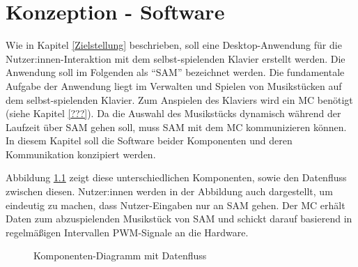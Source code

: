 
\nocite{*}
\chapter{Konzeption - Software} \label{vorgehenSW}


Wie in Kapitel \ref{Zielstellung} beschrieben, soll eine Desktop-Anwendung für die Nutzer:innen-Interaktion mit dem selbst-spielenden Klavier erstellt werden.
Die Anwendung soll im Folgenden als \enquote{\ac{SAM}} bezeichnet werden.
Die fundamentale Aufgabe der Anwendung liegt im Verwalten und Spielen von Musikstücken auf dem selbst-spielenden Klavier.
Zum Anspielen des Klaviers wird ein \ac{MC} benötigt (siehe Kapitel \ref{???}).
Da die Auswahl des Musikstücks dynamisch während der Laufzeit über \ac{SAM} gehen soll, muss \ac{SAM} mit dem \ac{MC} kommunizieren können.
In diesem Kapitel soll die Software beider Komponenten und deren Kommunikation konzipiert werden.

Abbildung \ref*{fig:high-level-komponenten} zeigt diese unterschiedlichen Komponenten, sowie den Datenfluss zwischen diesen.
Nutzer:innen werden in der Abbildung auch dargestellt, um eindeutig zu machen, dass Nutzer-Eingaben nur an \ac{SAM} gehen.
Der \ac{MC} erhält Daten zum abzuspielenden Musikstück von \ac{SAM} und schickt darauf basierend in regelmäßigen Intervallen \ac{PWM}-Signale an die Hardware.

\begin{figure}[htbp]
    \centering
    \caption{Komponenten-Diagramm mit Datenfluss}
    \label{fig:high-level-komponenten}
\end{figure}

